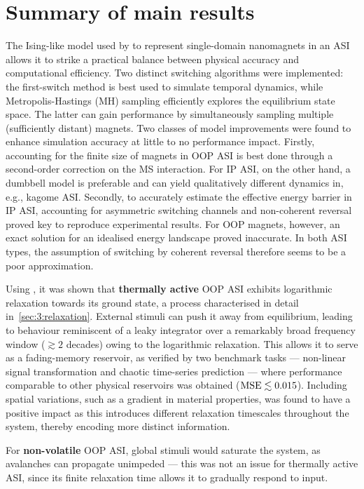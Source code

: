 \section{Summary of main results}
The Ising-like model used by \textbf{\hotspice} to represent single-domain nanomagnets in an ASI allows it to strike a practical balance between physical accuracy and computational efficiency.
Two distinct switching algorithms were implemented: the first-switch method is best used to simulate temporal dynamics, while Metropolis-Hastings (MH) sampling efficiently explores the equilibrium state space.
The latter can gain performance by simultaneously sampling multiple (sufficiently distant) magnets.
Two classes of model improvements were found to enhance simulation accuracy at little to no performance impact.
Firstly, accounting for the finite size of magnets in OOP ASI is best done through a second-order correction on the MS interaction.
For IP ASI, on the other hand, a dumbbell model is preferable and can yield qualitatively different dynamics in, e.g., kagome ASI.
Secondly, to accurately estimate the effective energy barrier in IP ASI, accounting for asymmetric switching channels and non-coherent reversal proved key to reproduce experimental results.
For OOP magnets, however, an exact solution for an idealised energy landscape proved inaccurate.
In both ASI types, the assumption of switching by coherent reversal therefore seems to be a poor approximation. \par
Using \hotspice, it was shown that \textbf{thermally active} OOP ASI exhibits logarithmic relaxation towards its ground state, a process characterised in detail in~\cref{sec:3:relaxation}.
External stimuli can push it away from equilibrium, leading to behaviour reminiscent of a leaky integrator over a remarkably broad frequency window ($\gtrsim 2$ decades) owing to the logarithmic relaxation.
This allows it to serve as a fading-memory reservoir, as verified by two benchmark tasks --- non-linear signal transformation and chaotic time-series prediction --- where performance comparable to other physical reservoirs was obtained ($\mathrm{MSE} \lesssim 0.015$).
Including spatial variations, such as a gradient in material properties, was found to have a positive impact as this introduces different relaxation timescales throughout the system, thereby encoding more distinct information. \par
For \textbf{non-volatile} OOP ASI, global stimuli would saturate the system, as avalanches can propagate unimpeded --- this was not an issue for thermally active ASI, since its finite relaxation time allows it to gradually respond to input.

